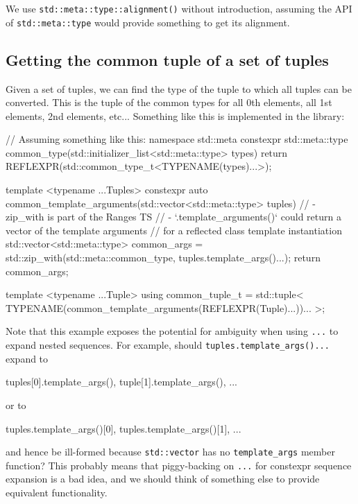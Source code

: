 \documentclass{wg21}
\newcommand{\cc}[1]{\texttt{#1}}
\begin{document}
We use \cc{std::meta::type::alignment()} without introduction, assuming the API
of \cc{std::meta::type} would provide something to get its alignment.


\subsection{Getting the common tuple of a set of tuples}
Given a set of tuples, we can find the type of the tuple to which all tuples can
be converted. This is the tuple of the common types for all 0th elements, all
1st elements, 2nd elements, etc... Something like this is implemented in the
\cite{range-v3} library:

\begin{cpp}
  // Assuming something like this:
  namespace std::meta {
    constexpr std::meta::type common_type(std::initializer_list<std::meta::type> types) {
      return REFLEXPR(std::common_type_t<TYPENAME(types)...>);
    }
  }

  template <typename ...Tuples>
  constexpr auto common_template_arguments(std::vector<std::meta::type> tuples) {
    // - zip_with is part of the Ranges TS
    // - `.template_arguments()` could return a vector of the template arguments
    //   for a reflected class template instantiation
    std::vector<std::meta::type> common_args = std::zip_with(std::meta::common_type,
                                                             tuples.template_args()...);
    return common_args;
  }

  template <typename ...Tuple>
  using common_tuple_t = std::tuple<
    TYPENAME(common_template_arguments(REFLEXPR(Tuple)...))...
  >;
\end{cpp}

Note that this example exposes the potential for ambiguity when using \cc{...}
to expand nested sequences. For example, should \cc{tuples.template_args()...}
expand to

\begin{cpp}
  tuples[0].template_args(), tuple[1].template_args(), ...
\end{cpp}

or to

\begin{cpp}
  tuples.template_args()[0], tuples.template_args()[1], ...
\end{cpp}

and hence be ill-formed because \cc{std::vector} has no \cc{template_args}
member function? This probably means that piggy-backing on \cc{...} for
constexpr sequence expansion is a bad idea, and we should think of something
else to provide equivalent functionality.
\end{document}
